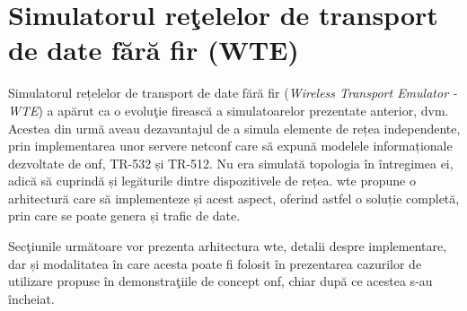 \chapter{Simulatorul reţelelor de transport de date fără fir (WTE)\label{ch:wte}}

\graphicspath{ {cap-wte/figures/} }

Simulatorul rețelelor de transport de date fără fir (\textit{Wireless Transport Emulator - WTE}) a apărut ca o evoluţie firească a simulatoarelor prezentate anterior, \gls{dvm}. Acestea din urmă aveau dezavantajul de a simula elemente de rețea independente, prin implementarea unor servere \gls{netconf} care să expună modelele informaționale dezvoltate de \gls{onf}, TR-532 și TR-512. Nu era simulată topologia în întregimea ei, adică să cuprindă și legăturile dintre dispozitivele de rețea. \gls{wte} propune o arhitectură care să implementeze și acest aspect, oferind astfel o soluție completă, prin care se poate genera și trafic de date.

Secţiunile următoare vor prezenta arhitectura \gls{wte}, detalii despre implementare, dar și modalitatea în care acesta poate fi folosit în prezentarea cazurilor de utilizare propuse în demonstraţiile de concept \gls{onf}, chiar după ce acestea s-au încheiat.




